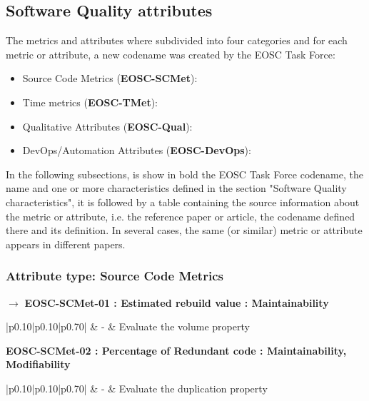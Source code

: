 \subsection{Software Quality attributes}

The metrics and attributes where subdivided into four categories and for each metric or attribute,
a new codename was created by the EOSC Task Force:

\begin{itemize}
    \item Source Code Metrics (\textbf{EOSC-SCMet}):
    \item Time metrics (\textbf{EOSC-TMet}):
    \item Qualitative Attributes (\textbf{EOSC-Qual}):
    \item DevOps/Automation Attributes (\textbf{EOSC-DevOps}):
\end{itemize}

In the following subsections, is show in bold the EOSC Task Force codename, the name and
one or more characteristics defined in the section "Software Quality characteristics", it is
followed by a table containing the source information about the metric or attribute, i.e. the
reference paper or article, the codename defined there and its definition. In several cases,
the same (or similar) metric or attribute appears in different papers.

\subsubsection{Attribute type: Source Code Metrics}

$\rightarrow$ \textbf{EOSC-SCMet-01 : Estimated rebuild value : Maintainability}
\begin{center}
    \tabletail{ \hline }
    \small
    \begin{supertabular}{|p{0.10\linewidth}|p{0.10\linewidth}|p{0.70\linewidth}|}
     \cite{srisopha_software_2018} & - & Evaluate the volume property \\ \hline
\end{supertabular}
\end{center}

\textbf{EOSC-SCMet-02 : Percentage of Redundant code : Maintainability, Modifiability}
\begin{center}
    \tabletail{ \hline }
    \small
    \begin{supertabular}{|p{0.10\linewidth}|p{0.10\linewidth}|p{0.70\linewidth}|}
     \cite{srisopha_software_2018} & - & Evaluate the duplication property \\ \hline
\end{supertabular}
\end{center}

